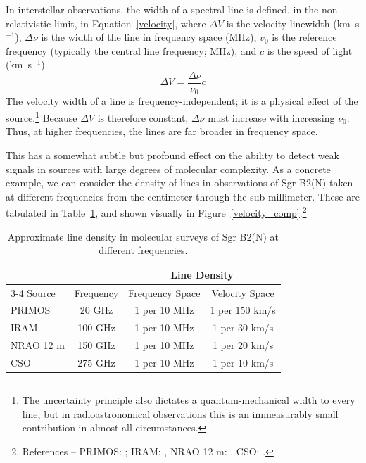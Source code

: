 \documentclass[twocolumn]{aastex631}
\begin{document}
In interstellar observations, the width of a spectral line is defined, in the non-relativistic limit, in Equation~\ref{velocity}, where $\Delta V$ is the velocity linewidth (km~s$^{-1}$), $\Delta\nu$ is the width of the line in frequency space (MHz), $v_0$ is the reference frequency (typically the central line frequency; MHz), and $c$ is the speed of light (km~s$^{-1}$).  
\begin{equation}
\Delta V = \frac{\Delta\nu}{\nu_0}c
\label{velocity}
\end{equation}
The velocity width of a line is frequency-independent; it is a physical effect of the source.\footnote{The uncertainty principle also dictates a quantum-mechanical width to every line, but in radioastronomical observations this is an immeasurably small contribution in almost all circumstances.}  Because $\Delta V$ is therefore constant, $\Delta\nu$ must increase with increasing $\nu_0$.  Thus, at higher frequencies, the lines are far broader in frequency space.

This has a somewhat subtle but profound effect on the ability to detect weak signals in sources with large degrees of molecular complexity.  As a concrete example, we can consider the density of lines in observations of Sgr B2(N) taken at different frequencies from the centimeter through the sub-millimeter.  These are tabulated in Table~\ref{density}, and shown visually in Figure~\ref{velocity_comp}.\footnote{References --  PRIMOS: \citet{Neill:2012fr}; IRAM: \citet{Belloche:2013eb}, NRAO 12 m: \citet{Remijan:2008rt}, CSO: \citet{McGuire:2013bb}. }

\begin{table}
\centering
\caption{Approximate line density in molecular surveys of Sgr B2(N) at different frequencies.}
\begin{tabular}{l | c c c}
\hline\hline
			&				&		\multicolumn{2}{c}{Line Density}					\\
\cline{3-4}
Source		&	Frequency	&		Frequency Space		&		Velocity Space		\\
\hline
PRIMOS		&	20 GHz		&		1 per 10 MHz			&		1 per 150 km/s		\\
IRAM		&	100 GHz		&		1 per 10 MHz			&		1 per 30 km/s		\\
NRAO 12 m	&	150 GHz		&		1 per 10 MHz			&		1 per 20 km/s		\\
CSO			&	275 GHz		&		1 per 10 MHz			&		1 per 10 km/s		\\
\hline
\end{tabular}
\label{density}
\end{table}
\end{document}
